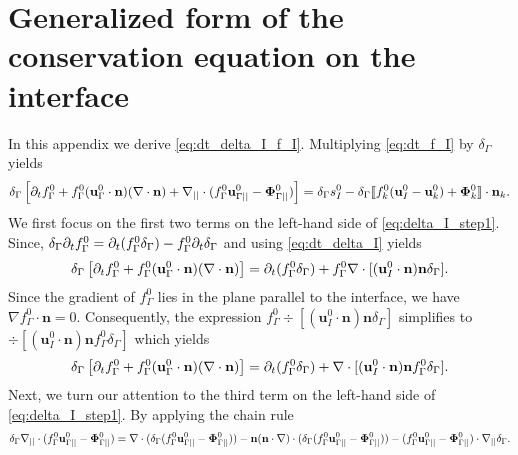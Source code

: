 \section{Generalized form of the conservation equation on the interface}
\label{ap:interface_proof}
In this appendix we derive \ref{eq:dt_delta_I_f_I}. Multiplying \ref{eq:dt_f_I} by $\delta_\Gamma$ yields
\begin{equation}
    \delta_\Gamma
    \left[ \partial_t f_\Gamma^0 
    + f_\Gamma^0 (\textbf{u}_\Gamma^0\cdot \textbf{n})  (\mathbf{\nabla}\cdot \textbf{n})
    +\mathbf{\nabla}_{||}\cdot
    (f_\Gamma^0 \textbf{u}_{\Gamma||}^0
    - \mathbf{\Phi}_{\Gamma||}^0 )
    \right]
    = \delta_\Gamma s_I^0
    - \delta_\Gamma\llbracket 
    f_k^0 (\textbf{u}_I^0 - \textbf{u}_k^0)
    + \mathbf{\Phi}_k^0 \rrbracket \cdot \textbf{n}_k.
    \label{eq:delta_I_step1}
\end{equation}
We first focus on the first two terms on the left-hand side of \ref{eq:delta_I_step1}. Since, $\delta_\Gamma\partial_t f_\Gamma^0 = \partial_t (f_\Gamma^0\delta_\Gamma) - f_\Gamma^0\partial_t\delta_\Gamma$ and using \ref{eq:dt_delta_I} yields
\begin{equation}
\delta_\Gamma
    \left[ \partial_t f_\Gamma^0 
    + f_\Gamma^0 (\textbf{u}_\Gamma^0\cdot \textbf{n})  (\mathbf{\nabla}\cdot \textbf{n}) \right] = \partial_t (f_\Gamma^0\delta_\Gamma) + f_\Gamma^0\mathbf{\nabla}\cdot [(\textbf{u}_I^0\cdot \textbf{n}) \textbf{n}\delta_\Gamma ].
\end{equation}
Since the gradient of $f_\Gamma^0$ lies in the plane parallel to the interface, we have  $\nabla f_\Gamma^0 \cdot \textbf{n} = 0$. Consequently, the expression $f_\Gamma^0\div [(\textbf{u}_I^0\cdot \textbf{n}) \textbf{n}\delta_\Gamma ]$ simplifies to $\div [(\textbf{u}_I^0\cdot \textbf{n}) \textbf{n}f_\Gamma^0\delta_\Gamma ]$ which yields 
\begin{equation}
\delta_\Gamma
    \left[ \partial_t f_\Gamma^0 
    + f_\Gamma^0 (\textbf{u}_\Gamma^0\cdot \textbf{n})  (\mathbf{\nabla}\cdot \textbf{n}) \right] = \partial_t (f_\Gamma^0\delta_\Gamma) + \mathbf{\nabla}\cdot [(\textbf{u}_I^0\cdot \textbf{n}) \textbf{n}f_\Gamma^0\delta_\Gamma ].
\label{eq:delta_I_step1_2}
\end{equation}
Next, we turn our attention to the third term on the left-hand side of \ref{eq:delta_I_step1}. By applying the chain rule
\begin{equation}
    \delta_\Gamma \divI (f_\Gamma^0 \textbf{u}_{\Gamma||}^0
    - \mathbf{\Phi}_{\Gamma||}^0 ) %
    = 
    \div (\delta_\Gamma (f_\Gamma^0 \textbf{u}_{\Gamma||}^0
    - \mathbf{\Phi}_{\Gamma||}^0 ))
    - \textbf{n}(\textbf{n}\cdot\grad)\cdot (\delta_\Gamma (f_\Gamma^0 \textbf{u}_{\Gamma||}^0
    - \mathbf{\Phi}_{\Gamma||}^0 ))
    - (f_\Gamma^0 \textbf{u}_{\Gamma||}^0
    - \mathbf{\Phi}_{\Gamma||}^0 )\cdot\gradI\delta_\Gamma.
\label{eq:delta_I_step2}
\end{equation}
